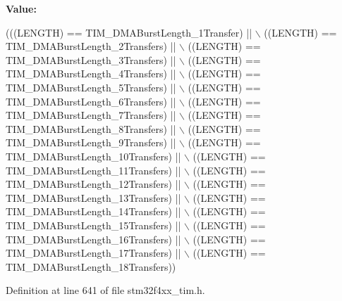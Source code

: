 {\bfseries Value\+:}
\begin{DoxyCode}
(((LENGTH) == TIM\_DMABurstLength\_1Transfer) || \(\backslash\)
                                   ((LENGTH) == TIM\_DMABurstLength\_2Transfers) || \(\backslash\)
                                   ((LENGTH) == TIM\_DMABurstLength\_3Transfers) || \(\backslash\)
                                   ((LENGTH) == TIM\_DMABurstLength\_4Transfers) || \(\backslash\)
                                   ((LENGTH) == TIM\_DMABurstLength\_5Transfers) || \(\backslash\)
                                   ((LENGTH) == TIM\_DMABurstLength\_6Transfers) || \(\backslash\)
                                   ((LENGTH) == TIM\_DMABurstLength\_7Transfers) || \(\backslash\)
                                   ((LENGTH) == TIM\_DMABurstLength\_8Transfers) || \(\backslash\)
                                   ((LENGTH) == TIM\_DMABurstLength\_9Transfers) || \(\backslash\)
                                   ((LENGTH) == TIM\_DMABurstLength\_10Transfers) || \(\backslash\)
                                   ((LENGTH) == TIM\_DMABurstLength\_11Transfers) || \(\backslash\)
                                   ((LENGTH) == TIM\_DMABurstLength\_12Transfers) || \(\backslash\)
                                   ((LENGTH) == TIM\_DMABurstLength\_13Transfers) || \(\backslash\)
                                   ((LENGTH) == TIM\_DMABurstLength\_14Transfers) || \(\backslash\)
                                   ((LENGTH) == TIM\_DMABurstLength\_15Transfers) || \(\backslash\)
                                   ((LENGTH) == TIM\_DMABurstLength\_16Transfers) || \(\backslash\)
                                   ((LENGTH) == TIM\_DMABurstLength\_17Transfers) || \(\backslash\)
                                   ((LENGTH) == TIM\_DMABurstLength\_18Transfers))
\end{DoxyCode}


Definition at line 641 of file stm32f4xx\+\_\+tim.\+h.

